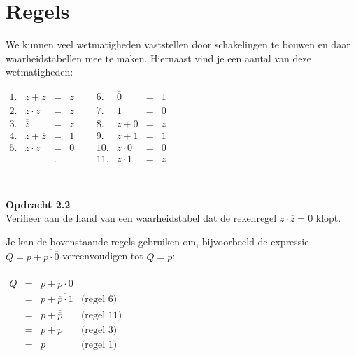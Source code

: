 \documentclass[11pt,a5paper]{report}
\begin{document}
\section*{Regels}
\begin{minipage}[t]{0.45\textwidth}
We kunnen veel wetmatigheden vaststellen door schakelingen te bouwen en daar waarheidstabellen mee te maken. Hiernaast vind je een aantal van deze wetmatigheden:
\end{minipage}%
\hfill
\begin{minipage}[t]{0.53\textwidth}
\vspace*{-1em}
\(
\begin{array}{rccccrccc}
1. & z + z &=& z                           &\ \ \ & 6. &\overline{0} &=& 1 \\
2. & z \cdot z &=& z                     &      & 7. & \overline{1} &=& 0 \\
3. & \overline{\overline{z}} &=& z &      &  8. & z + 0 &=& z     \\
4. & z + \overline{z} &=& 1           &       & 9. & z + 1 &=& 1    \\
5. & z \cdot \overline{z} &=& 0     &       & 10. & z \cdot 0 &=& 0 \\
    &                               &.  &        &       & 11. & z \cdot 1 &=& z
\end{array}
\)
\end{minipage}\\

\begin{framed}
\textbf{Opdracht 2.2}\\
Verifieer aan de hand van een waarheidstabel dat de rekenregel $z \cdot \overline{z} = 0$ klopt.
\end{framed}


\begin{minipage}[t]{0.60\textwidth}
Je kan de bovenstaande regels gebruiken om, bijvoorbeeld de expressie $Q = p + \overline{p \cdot \overline{0}}$ vereenvoudigen tot $Q = p$:
\end{minipage}%
\hfill
\begin{minipage}[t]{0.35\textwidth}
\vspace*{-1em}
\(
\begin{array}{rcll}
Q &=& p +  \overline{p \cdot \overline{0}} \\
  &=& p + \overline{\overline{p} \cdot 1} & \text{(regel 6)} \\
  &=& p + \overline{\overline{p}} & \text{(regel 11)} \\
  &=& p + p & \text{(regel 3)} \\
  &=& p & \text{(regel 1)}
\end{array}
\)
\end{minipage}\\
\end{document}
